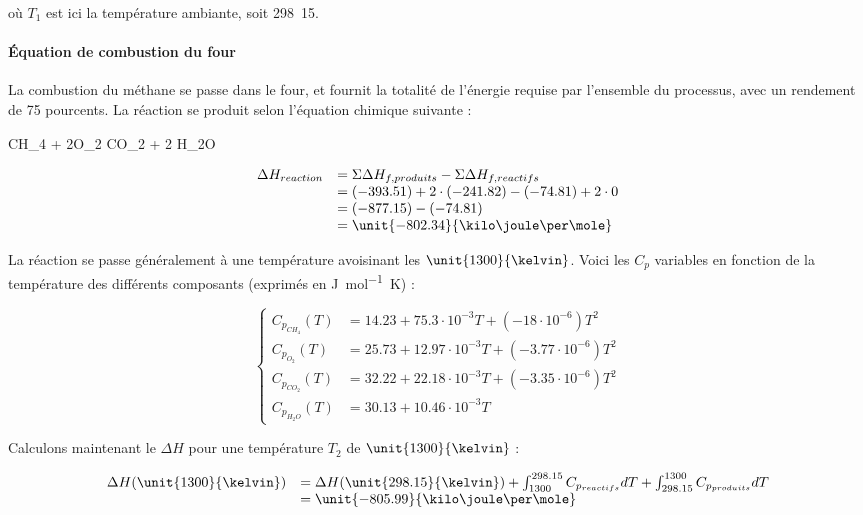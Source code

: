 où $T_1$ est ici la température ambiante, soit \unit{298.15}{\kelvin}.

\paragraph{\'Equation de combustion du four}
La combustion du méthane se passe dans le four, et fournit la totalité de l'énergie 
requise par l'ensemble du processus, avec un rendement de 75 pourcents.
La réaction se produit selon l'équation chimique suivante :

\begin{chemmath}
	CH_4 + 2O_2 \Longrightarrow CO_2 + 2 H_2O
\end{chemmath}

$$
	\begin{array}{rl}
	\Delta H_{reaction}		&=  \Sigma \Delta H_{f,produits} - \Sigma \Delta H_{f,reactifs} \\
												&=  (-393.51) + 2\cdot(-241.82) - (-74.81) + 2\cdot0 \\
												&=  (-877.15) - (-74.81)\\
												&=  \unit{-802.34}{\kilo\joule\per\mole}
	\end{array}
$$

La réaction se passe généralement à une température avoisinant les $\unit{1300}{\kelvin}$.
Voici les $C_p$ variables en fonction de la température des différents composants\cite{hc-table} 
(exprimés en \unit{\joule\per\mole\kelvin}) :

$$
	\left\{
		\begin{array}{rl}
			C_{p_{CH_4}}(T) 	&= 14.23 + 75.3\cdot10^{-3}T + (-18\cdot10^{-6})T^2 \\
			C_{p_{O_2}}(T) 		&= 25.73 + 12.97\cdot10^{-3}T + (-3.77\cdot10^{-6})T^2 \\
			C_{p_{CO_2}}(T) 	&= 32.22 + 22.18\cdot10^{-3}T + (-3.35\cdot10^{-6})T^2 \\
			C_{p_{H_2O}}(T) 	&= 30.13 + 10.46\cdot10^{-3}T 
		\end{array}
	\right.
$$	

Calculons maintenant le $\Delta H$ pour une température $T_2$ de $\unit{1300}{\kelvin}$ :

$$
	\begin{array}{rl}
		 	\Delta H(\unit{1300}{\kelvin}) 	&=  \Delta H(\unit{298.15}{\kelvin}) + \int_{1300}^{298.15} C_{p_{reactifs}} dT + \int_{298.15}^{1300} C_{p_{produits}} dT \\
																			&=  \unit{-805.99}{\kilo\joule\per\mole}
	\end{array}
$$	

